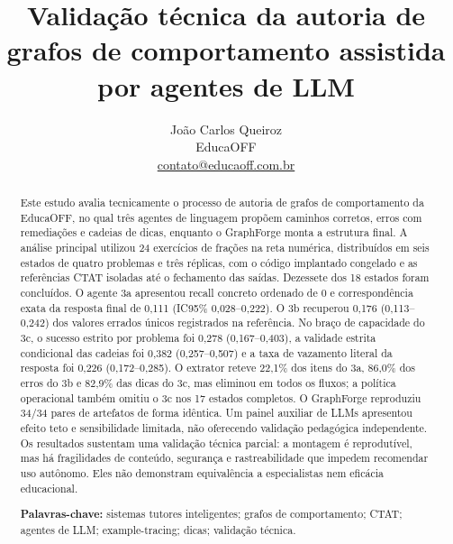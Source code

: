 \title{\bfseries Validação técnica da autoria de grafos de comportamento assistida por agentes de LLM}
\author{João Carlos Queiroz\\\small EducaOFF\\\small \href{mailto:contato@educaoff.com.br}{contato@educaoff.com.br}}
\date{}

\maketitle

\begin{abstract}
Este estudo avalia tecnicamente o processo de autoria de grafos de comportamento da EducaOFF, no qual três agentes de linguagem propõem caminhos corretos, erros com remediações e cadeias de dicas, enquanto o GraphForge monta a estrutura final. A análise principal utilizou 24 exercícios de frações na reta numérica, distribuídos em seis estados de quatro problemas e três réplicas, com o código implantado congelado e as referências CTAT isoladas até o fechamento das saídas. Dezessete dos 18 estados foram concluídos. O agente 3a apresentou recall concreto ordenado de 0 e correspondência exata da resposta final de 0,111 (IC95\% 0,028--0,222). O 3b recuperou 0,176 (0,113--0,242) dos valores errados únicos registrados na referência. No braço de capacidade do 3c, o sucesso estrito por problema foi 0,278 (0,167--0,403), a validade estrita condicional das cadeias foi 0,382 (0,257--0,507) e a taxa de vazamento literal da resposta foi 0,226 (0,172--0,285). O extrator reteve 22,1\% dos itens do 3a, 86,0\% dos erros do 3b e 82,9\% das dicas do 3c, mas eliminou  em todos os fluxos; a política operacional também omitiu o 3c nos 17 estados completos. O GraphForge reproduziu 34/34 pares de artefatos de forma idêntica. Um painel auxiliar de LLMs apresentou efeito teto e sensibilidade limitada, não oferecendo validação pedagógica independente. Os resultados sustentam uma validação técnica parcial: a montagem é reprodutível, mas há fragilidades de conteúdo, segurança e rastreabilidade que impedem recomendar uso autônomo. Eles não demonstram equivalência a especialistas nem eficácia educacional.

\smallskip\noindent\textbf{Palavras-chave:} sistemas tutores inteligentes; grafos de comportamento; CTAT; agentes de LLM; example-tracing; dicas; validação técnica.
\end{abstract}

